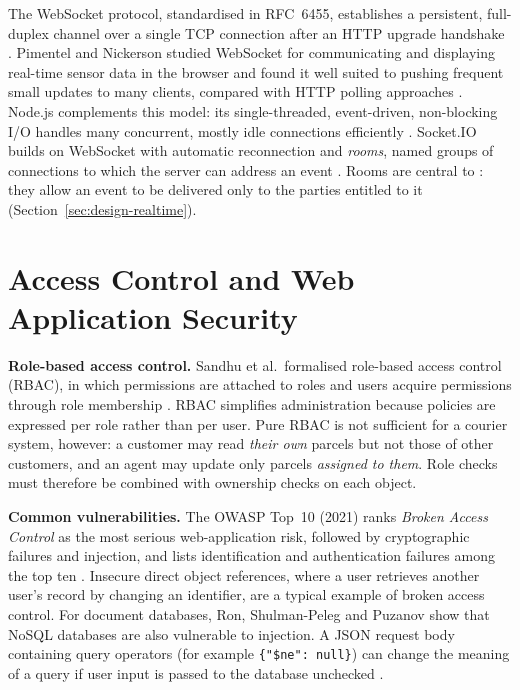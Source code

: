 The WebSocket protocol, standardised in RFC~6455, establishes a persistent, full-duplex channel over a single TCP connection after an HTTP upgrade handshake \cite{rfc6455}. Pimentel and Nickerson studied WebSocket for communicating and displaying real-time sensor data in the browser and found it well suited to pushing frequent small updates to many clients, compared with HTTP polling approaches \cite{pimentel2012websocket}. Node.js complements this model: its single-threaded, event-driven, non-blocking I/O handles many concurrent, mostly idle connections efficiently \cite{tilkov2010node}. Socket.IO builds on WebSocket with automatic reconnection and \emph{rooms}, named groups of connections to which the server can address an event \cite{socketio}. Rooms are central to \scpms: they allow an event to be delivered only to the parties entitled to it (Section~\ref{sec:design-realtime}).

\section{Access Control and Web Application Security}
\label{sec:lit-security}

\textbf{Role-based access control.} Sandhu et al.\ formalised role-based access control (RBAC), in which permissions are attached to roles and users acquire permissions through role membership \cite{sandhu1996rbac}. RBAC simplifies administration because policies are expressed per role rather than per user. Pure RBAC is not sufficient for a courier system, however: a customer may read \emph{their own} parcels but not those of other customers, and an agent may update only parcels \emph{assigned to them}. Role checks must therefore be combined with ownership checks on each object.

\textbf{Common vulnerabilities.} The OWASP Top~10 (2021) ranks \emph{Broken Access Control} as the most serious web-application risk, followed by cryptographic failures and injection, and lists identification and authentication failures among the top ten \cite{owasptop10}. Insecure direct object references, where a user retrieves another user's record by changing an identifier, are a typical example of broken access control. For document databases, Ron, Shulman-Peleg and Puzanov show that NoSQL databases are also vulnerable to injection. A JSON request body containing query operators (for example \texttt{\{"\$ne": null\}}) can change the meaning of a query if user input is passed to the database unchecked \cite{ron2016nosql}.

